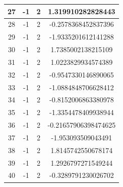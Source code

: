 \documentclass[]{article}
\begin{document}
\begin{table}[!h]
\begin{tabular}{|c|c|c|c|}
			27 & -1 &	 2 &	 1.319910282828443 \\ \hline
			28 & -1 &	 2 &	 -0.2578368452837396 \\ \hline
			29 & -1 &	 2 &	 -1.9335201612141288 \\ \hline
			30 & -1 &	 2 &	 1.7385002138215109 \\ \hline
			31 & -1 &	 2 &	 1.0223829934574389 \\ \hline
			32 & -1 &	 2 &	 -0.9547330146890065 \\ \hline
			33 & -1 &	 2 &	 -1.0884848706628412 \\ \hline
			34 & -1 &	 2 &	 -0.8152006863380978 \\ \hline
			35 & -1 &	 2 &	 -1.3354478409938944 \\ \hline
			36 & -1 &	 2 &	 -0.21657906398474625 \\ \hline
			37 & -1 &	 2 &	 -1.953093509043491 \\ \hline
			38 & -1 &	 2 &	 1.8145742550678174 \\ \hline
			39 & -1 &	 2 &	 1.2926797271549244 \\ \hline
			40 & -1 &	 2 &	 -0.3289791230026702 \\ \hline
		\end{tabular}
	\end{table}
	
\end{document}

